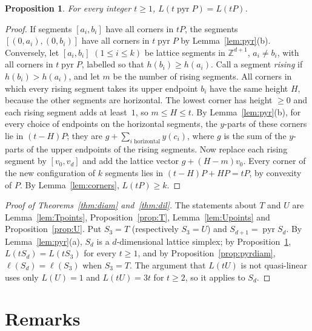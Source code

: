 \documentclass[11pt]{article}
\newtheorem{proposition}{Proposition}
\theoremstyle{definition}
\theoremstyle{remark}
\newcommand{\Z}{\mathbb Z}
\DeclareMathOperator{\pyr}{pyr}
\begin{document}
\begin{proposition}\label{prop:pyrlen}
For every integer $t\ge1$, $L(t\pyr P)=L(tP)$.
\end{proposition}

\begin{proof}
If segments $[a_i,b_i]$ have all corners in $tP$, the segments
$[(0,a_i),(0,b_i)]$ have all corners in $t\pyr P$ by Lemma~\ref{lem:pyr}(b).
Conversely, let $[a_i,b_i]$ $(1\le i\le k)$ be lattice segments in
$\Z^{d+1}$, $a_i\ne b_i$, with all corners in $t\pyr P$, labelled so that
$h(b_i)\ge h(a_i)$. Call a segment \emph{rising} if $h(b_i)>h(a_i)$, and let
$m$ be the number of rising segments. All corners in which every rising
segment takes its upper endpoint $b_i$ have the same height $H$, because the
other segments are horizontal. The lowest corner has height $\ge0$ and each
rising segment adds at least~$1$, so $m\le H\le t$. By
Lemma~\ref{lem:pyr}(b), for every choice of endpoints on the horizontal
segments, the $y$-parts of these corners lie in $(t-H)P$; they are
$g+\sum_{i\text{ horizontal}}y(c_i)$, where $g$ is the sum of the $y$-parts
of the upper endpoints of the rising segments. Now replace each rising
segment by $[v_0,v_d]$ and add the lattice vector $g+(H-m)v_0$. Every corner
of the new configuration of $k$ segments lies in $(t-H)P+HP=tP$, by convexity
of $P$. By Lemma~\ref{lem:corners}, $L(tP)\ge k$.
\end{proof}

\begin{proof}[Proof of Theorems~\ref{thm:diam} and~\ref{thm:dil}]
The statements about $T$ and $U$ are Lemma~\ref{lem:Tpoints},
Proposition~\ref{prop:T}, Lemma~\ref{lem:Upoints} and
Proposition~\ref{prop:U}. Put $S_3=T$ (respectively $S_3=U$) and
$S_{d+1}=\pyr S_d$. By Lemma~\ref{lem:pyr}(a), $S_d$ is a $d$-dimensional
lattice simplex; by Proposition~\ref{prop:pyrlen}, $L(tS_d)=L(tS_3)$ for every
$t\ge1$, and by Proposition~\ref{prop:pyrdiam}, $\ell(S_d)=\ell(S_3)$ when
$S_3=T$. The argument that $L(tU)$ is not quasi-linear uses only $L(U)=1$
and $L(tU)=3t$ for $t\ge2$, so it applies to $S_d$.
\end{proof}

\section{Remarks}\label{sec:remarks}
\end{document}
